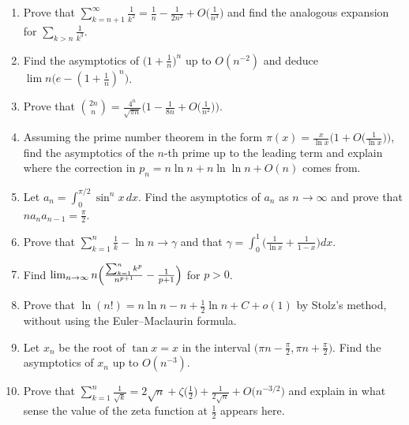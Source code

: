 \documentclass[11pt,a4paper]{article}
\begin{document}
\begin{enumerate}[itemsep=0.6em]
\item Prove that $\sum_{k=n+1}^\infty\frac1{k^2}=\frac1n-\frac1{2n^2}+O\bigl(\frac1{n^3}\bigr)$ and
find the analogous expansion for $\sum_{k>n}\frac1{k^3}$.

\item Find the asymptotics of $\bigl(1+\frac1n\bigr)^n$ up to $O(n^{-2})$ and deduce
$\lim n\bigl(e-(1+\frac1n)^n\bigr)$.

\item Prove that $\binom{2n}{n}=\frac{4^n}{\sqrt{\pi n}}\bigl(1-\frac1{8n}+O\bigl(\frac1{n^2}\bigr)\bigr)$.

\item Assuming the prime number theorem in the form
$\pi(x)=\frac{x}{\ln x}\bigl(1+O\bigl(\frac1{\ln x}\bigr)\bigr)$, find the asymptotics of the
$n$-th prime up to the leading term and explain where the correction in
$p_n=n\ln n+n\ln\ln n+O(n)$ comes from.

\item Let $a_n=\int_0^{\pi/2}\sin^nx\,dx$. Find the asymptotics of $a_n$ as $n\to\infty$ and prove
that $na_na_{n-1}=\frac\pi2$.

\item Prove that $\sum_{k=1}^n\frac1k-\ln n\to\gamma$ and that
$\gamma=\int_0^1\bigl(\frac1{\ln x}+\frac1{1-x}\bigr)dx$.

\item Find $\lim_{n\to\infty}n\Bigl(\frac{\sum_{k=1}^nk^p}{n^{p+1}}-\frac1{p+1}\Bigr)$ for $p>0$.

\item Prove that $\ln(n!)=n\ln n-n+\frac12\ln n+C+o(1)$ by Stolz's method, without using the
Euler--Maclaurin formula.

\item Let $x_n$ be the root of $\tan x=x$ in the interval $\bigl(\pi n-\frac\pi2,\pi n+\frac\pi2\bigr)$.
Find the asymptotics of $x_n$ up to $O(n^{-3})$.

\item Prove that $\sum_{k=1}^n\frac1{\sqrt k}=2\sqrt n+\zeta\bigl(\frac12\bigr)+\frac1{2\sqrt n}+O\bigl(n^{-3/2}\bigr)$
and explain in what sense the value of the zeta function at $\frac12$ appears here.
\end{enumerate}
\end{document}
